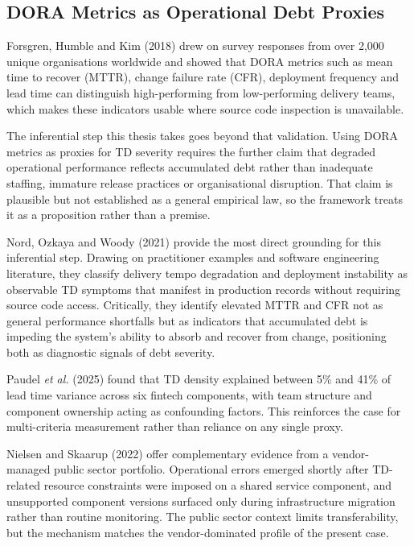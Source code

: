 \documentclass[
  12pt,
  letterpaper,
  12pt,
  oneside,
  english,
  onehalfspacing,
  headsepline]{MastersDoctoralThesis}
\begin{document}
\subsection{DORA Metrics as Operational Debt
Proxies}\label{dora-metrics-as-operational-debt-proxies}

Forsgren, Humble and Kim (2018) drew on survey responses from over 2,000
unique organisations worldwide and showed that DORA metrics such as mean
time to recover (MTTR), change failure rate (CFR), deployment frequency
and lead time can distinguish high-performing from low-performing
delivery teams, which makes these indicators usable where source code
inspection is unavailable.

The inferential step this thesis takes goes beyond that validation.
Using DORA metrics as proxies for TD severity requires the further claim
that degraded operational performance reflects accumulated debt rather
than inadequate staffing, immature release practices or organisational
disruption. That claim is plausible but not established as a general
empirical law, so the framework treats it as a proposition rather than a
premise.

Nord, Ozkaya and Woody (2021) provide the most direct grounding for this
inferential step. Drawing on practitioner examples and software
engineering literature, they classify delivery tempo degradation and
deployment instability as observable TD symptoms that manifest in
production records without requiring source code access. Critically,
they identify elevated MTTR and CFR not as general performance
shortfalls but as indicators that accumulated debt is impeding the
system's ability to absorb and recover from change, positioning both as
diagnostic signals of debt severity.

Paudel \emph{et al.} (2025) found that TD density explained between 5\%
and 41\% of lead time variance across six fintech components, with team
structure and component ownership acting as confounding factors. This
reinforces the case for multi-criteria measurement rather than reliance
on any single proxy.

Nielsen and Skaarup (2022) offer complementary evidence from a
vendor-managed public sector portfolio. Operational errors emerged
shortly after TD-related resource constraints were imposed on a shared
service component, and unsupported component versions surfaced only
during infrastructure migration rather than routine monitoring. The
public sector context limits transferability, but the mechanism matches
the vendor-dominated profile of the present case.
\end{document}
